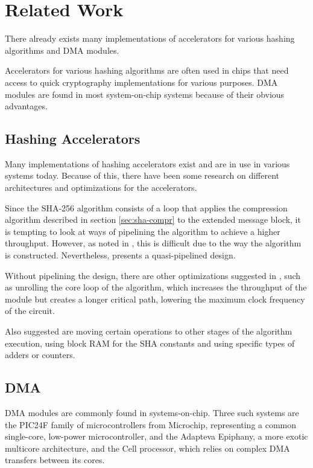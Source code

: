 \chapter{Related Work}
\label{cha:related-work}

There already exists many implementations of accelerators for various hashing
algorithms and DMA modules.

Accelerators for various hashing algorithms are often used in chips that need
access to quick cryptography implementations for various purposes. DMA modules are
found in most system-on-chip systems because of their obvious advantages.

\section{Hashing Accelerators}
\label{sec:previous-hash}
Many implementations of hashing accelerators exist and are in use in various
systems today. Because of this, there have been some research on different
architectures and optimizations for the accelerators.

Since the SHA-256 algorithm consists of a loop that applies the compression
algorithm described in section \ref{sec:sha-compr} to the extended message
block, it is tempting to look at ways of pipelining the algorithm to achieve
a higher throughput. However, as noted in \cite{sha-opt}, this is difficult
due to the way the algorithm is constructed. Nevertheless, \cite{dadda-sha}
presents a quasi-pipelined design.

Without pipelining the design, there are other optimizations suggested in
\cite{sha-opt}, such as unrolling the core loop of the algorithm, which
increases the throughput of the module but creates a longer critical path,
lowering the maximum clock frequency of the circuit.

Also suggested are moving certain operations to other stages of the algorithm
execution, using block RAM for the SHA constants and using specific types of
adders or counters.

\section{DMA}
DMA modules are commonly found in systems-on-chip. Three such systems are the
PIC24F family of microcontrollers from Microchip, representing a common
single-core, low-power microcontroller, and the Adapteva Epiphany, a more
exotic multicore architecture, and the Cell processor, which relies on complex DMA transfers between its cores.

